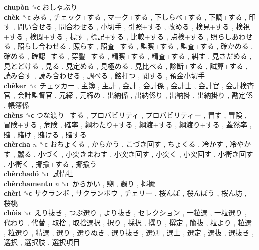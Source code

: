 \textbf{chupòn} ␝ϲ   おしゃぶり   \\
\textbf{chèk} ␝ϲ   みる ,  チェック+する ,  マーク+する ,  下しらべ+する ,  下調+する ,  印す ,  問い合せる ,  問合わせる ,  小切手 ,  引照+する ,  改める ,  検見+する ,  検視+する ,  検閲+する ,  標す ,  標記+する ,  比較+する ,  点検+する ,  照らしあわせる ,  照らし合わせる ,  照らす ,  照査+する ,  監察+する ,  監査+する ,  確かめる ,  確める ,  確認+する ,  穿鑿+する ,  精察+する ,  精査+する ,  糾す ,  見さだめる ,  見とどける ,  見る ,  見定める ,  見極める ,  見比べる ,  診断+する ,  試算+する ,  読み合す ,  読み合わせる ,  調べる ,  銘打つ ,  閲する ,  預金小切手   \\
\textbf{chèker} ␝ϲ   チェッカー ,  主簿 ,  主計 ,  会計 ,  会計係 ,  会計士 ,  会計官 ,  会計検査官 ,  会計監督官 ,  元締 ,  元締め ,  出納係 ,  出納係り ,  出納掛 ,  出納掛り ,  勘定係 ,  帳簿係   \\
\textbf{chèns} ␝ϲ   つな渡り+する ,  プロバビリティ ,  プロバビリティー ,  冒す ,  冒険 ,  冒険+する ,  危険 ,  確率 ,  綱わたり+する ,  綱渡+する ,  綱渡り+する ,  蓋然率 ,  賭 ,  賭け ,  賭ける ,  賭する   \\
\textbf{chèrcha} \emph{n}  ␝ϲ   おちょくる ,  からかう ,  こづき回す ,  ちょくる ,  冷かす ,  冷やかす ,  嬲る ,  小づく ,  小突きまわす ,  小突き回す ,  小突く ,  小突回す ,  小衝き回す ,  小衝く ,  揶揄+する ,  揶揄う   \\
\textbf{chèrchadó} ␝ϲ   試情牡   \\
\textbf{chèrchamentu} \emph{n}  ␝ϲ   からかい ,  嬲 ,  嬲り ,  揶揄   \\
\textbf{chèri} ␝ϲ   サクランボ ,  サクランボウ ,  チェリー ,  桜んぼ ,  桜んぼう ,  桜ん坊 ,  桜桃   \\
\textbf{chòis} ␝ϲ   えり抜き ,  つぶ選り ,  より抜き ,  セレクション ,  一粒選 ,  一粒選り ,  代わり ,  代替 ,  取捨 ,  取捨選択 ,  択り ,  採択 ,  撰り ,  撰定 ,  簡抜 ,  粒より ,  粒選 ,  粒選り ,  精選 ,  選り ,  選りぬき ,  選り抜き ,  選別 ,  選士 ,  選定 ,  選抜 ,  選抜き ,  選択 ,  選択肢 ,  選択項目   \\
